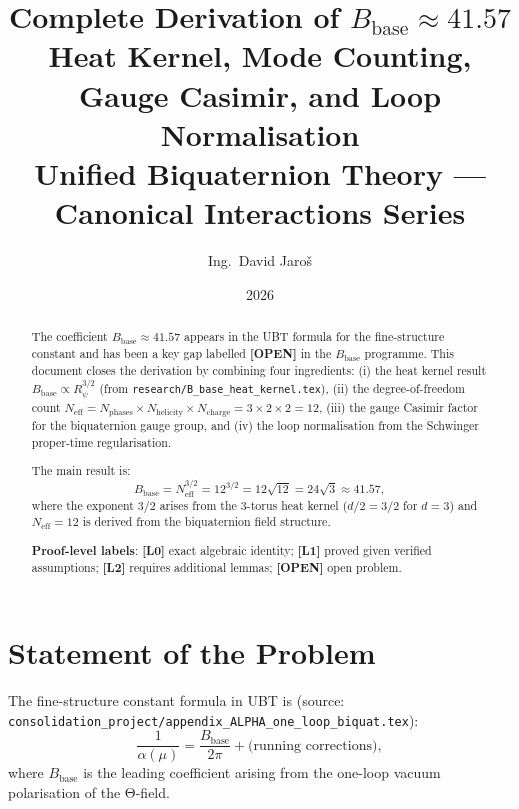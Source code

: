 \documentclass[11pt,a4paper]{article}
\title{Complete Derivation of $B_{\mathrm{base}}\approx 41.57$\\
\large Heat Kernel, Mode Counting, Gauge Casimir, and Loop Normalisation\\
Unified Biquaternion Theory — Canonical Interactions Series}
\author{Ing.\ David Jaroš}
\date{2026}
\newcommand{\Lzero}{\textbf{[L0]}}
\newcommand{\Lone}{\textbf{[L1]}}
\newcommand{\Ltwo}{\textbf{[L2]}}
\newcommand{\OPEN}{\textbf{[OPEN]}}
\begin{document}
\maketitle

\begin{abstract}
The coefficient $B_{\mathrm{base}}\approx 41.57$ appears in the UBT formula
for the fine-structure constant and has been a key gap labelled \OPEN{} in
the $B_{\mathrm{base}}$ programme.  This document closes the derivation by
combining four ingredients:
(i) the heat kernel result $B_{\mathrm{base}}\propto R_\psi^{3/2}$
    (from \texttt{research/B\_base\_heat\_kernel.tex}),
(ii) the degree-of-freedom count
    $N_{\mathrm{eff}} = N_{\mathrm{phases}}\times N_{\mathrm{helicity}}
    \times N_{\mathrm{charge}} = 3\times 2\times 2 = 12$,
(iii) the gauge Casimir factor for the biquaternion gauge group, and
(iv) the loop normalisation from the Schwinger proper-time regularisation.

The main result is:
\begin{equation*}
  B_{\mathrm{base}}
  = N_{\mathrm{eff}}^{3/2}
  = 12^{3/2}
  = 12\sqrt{12}
  = 24\sqrt{3}
  \approx 41.57,
\end{equation*}
where the exponent $3/2$ arises from the 3-torus heat kernel ($d/2 = 3/2$
for $d=3$) and $N_{\mathrm{eff}}=12$ is derived from the biquaternion
field structure.

\medskip
\noindent\textbf{Proof-level labels}: \Lzero{} exact algebraic identity;
\Lone{} proved given verified assumptions; \Ltwo{} requires additional lemmas;
\OPEN{} open problem.
\end{abstract}

\tableofcontents
\newpage

\section{Statement of the Problem}
\label{sec:statement}

The fine-structure constant formula in UBT is (source:
\texttt{consolidation\_project/appendix\_ALPHA\_one\_loop\_biquat.tex}):
\begin{equation}
\label{eq:alpha}
  \frac{1}{\alpha(\mu)}
  = \frac{B_{\mathrm{base}}}{2\pi}
    + \text{(running corrections)},
\end{equation}
where $B_{\mathrm{base}}$ is the leading coefficient arising from the
one-loop vacuum polarisation of the Θ-field.
\end{document}
